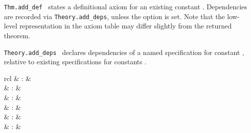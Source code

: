 \begin{isabellebody}
\begin{isamarkuptext}
\begin{description}
  \item \verb|Thm.add_def|~ states a definitional axiom for an existing constant
  .  Dependencies are recorded via \verb|Theory.add_deps|,
  unless the  option is set.  Note that the
  low-level representation in the axiom table may differ slightly from
  the returned theorem.

  \item \verb|Theory.add_deps|~
  declares dependencies of a named specification for constant , relative to existing specifications for constants .

  \end{description}%
\end{isamarkuptext}%
\isamarkuptrue%
%
\endisatagmlref
{\isafoldmlref}%
%
\isadelimmlref
%
\endisadelimmlref
%
\isadelimmlantiq
%
\endisadelimmlantiq
%
\isatagmlantiq
%
\begin{isamarkuptext}%
\begin{matharray}{rcl}
  \hypertarget{ML antiquotation.ctyp}{\hyperlink{ML antiquotation.ctyp}{\mbox{}}} & : &  \\
  \hypertarget{ML antiquotation.cterm}{\hyperlink{ML antiquotation.cterm}{\mbox{}}} & : &  \\
  \hypertarget{ML antiquotation.cprop}{\hyperlink{ML antiquotation.cprop}{\mbox{}}} & : &  \\
  \hypertarget{ML antiquotation.thm}{\hyperlink{ML antiquotation.thm}{\mbox{}}} & : &  \\
  \hypertarget{ML antiquotation.thms}{\hyperlink{ML antiquotation.thms}{\mbox{}}} & : &  \\
  \hypertarget{ML antiquotation.lemma}{\hyperlink{ML antiquotation.lemma}{\mbox{}}} & : &  \\
  \end{matharray}


\end{isamarkuptext}
\end{isabellebody}
